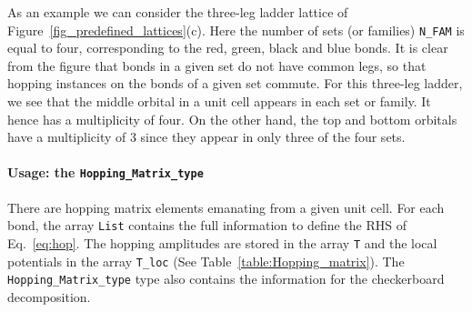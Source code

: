 As an  example we can consider the three-leg ladder lattice of Figure~\ref{fig_predefined_lattices}(c).   Here the number of sets (or families) \texttt{N\_FAM} is equal to four, corresponding to the red, green, black and blue  bonds. It is clear from the figure that bonds in a given set do not have common legs, so that hopping instances on the bonds of a given set commute.  For this three-leg ladder, we see that the middle orbital in a unit cell appears in each set or family. It hence has a multiplicity of four. On the other hand, the top and bottom orbitals have a multiplicity of 3 since they appear in only three of the four sets. 


\paragraph*{Usage: the \texttt{Hopping\_Matrix\_type} } %

There are     hopping   matrix  elements  emanating  from  a  given unit  cell. For  each bond,  the array 
\texttt{List}   contains the full  information to define the  RHS of Eq.~\eqref{eq:hop}.    The hopping amplitudes are  stored in the  array  \texttt{T}  and the local potentials in the  array \texttt{T\_loc}   (See  Table~\ref{table:Hopping_matrix}).    The  \texttt{Hopping\_Matrix\_type}   type    also contains the information for the  checkerboard   decomposition.

